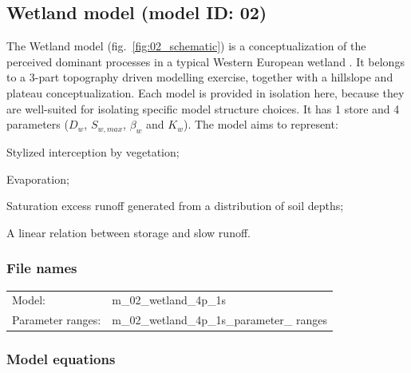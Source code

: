 \subsection{Wetland model (model ID: 02)}
The Wetland model (fig.~\ref{fig:02_schematic}) is a conceptualization of the perceived dominant processes in a typical Western European wetland \citep{Savenije2010}. It belongs to a 3-part topography driven modelling exercise, together with a hillslope and plateau conceptualization. Each model is provided in isolation here, because they are well-suited for isolating specific model structure choices. It has 1 store and 4 parameters ($D_w$, $S_{w,max}$, $\beta_w$ and $K_w$). The model aims to represent:

\begin{itemizecompact}
\item Stylized interception by vegetation;
\item Evaporation;
\item Saturation excess runoff generated from a distribution of soil depths;
\item A linear relation between storage and slow runoff.
\end{itemizecompact}

\subsubsection{File names}
\begin{tabular}{@{}ll}
Model: &m\_02\_wetland\_4p\_1s \\
Parameter ranges: &m\_02\_wetland\_4p\_1s\_parameter\_ ranges \\
\end{tabular}

\subsubsection{Model equations}

